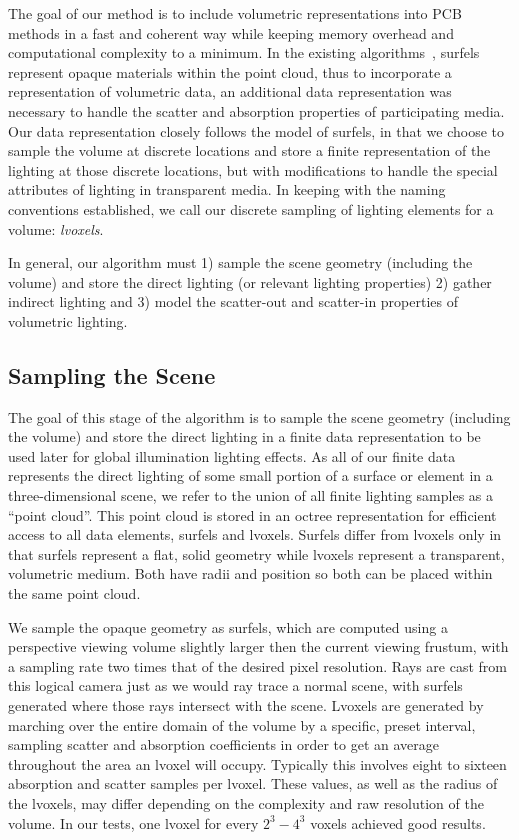 \documentclass[runningheads]{llncs}
\begin{document}
The goal of our method is to include volumetric representations into PCB methods in a fast and coherent way while keeping memory overhead and computational complexity to a minimum.  In the existing algorithms~\cite{christensen:2008}, surfels represent opaque materials within the point cloud, thus to incorporate a representation of volumetric data, an additional data representation was necessary to handle the scatter and absorption properties of participating media.  Our data representation closely follows the model of surfels, in that we choose to sample the volume at discrete locations and store a finite representation of the lighting at those discrete locations, but with modifications to handle the special attributes of lighting in transparent media.  In keeping with the naming conventions established, we call our discrete sampling of lighting elements for a volume: \emph{lvoxels}.  

In general, our algorithm must 1) sample the scene geometry (including the volume) and store the direct lighting (or relevant lighting properties) 2) gather indirect lighting and 3) model the scatter-out and scatter-in properties of volumetric lighting.

\subsection{Sampling the Scene}
The goal of this stage of the algorithm is to sample the scene geometry (including the volume) and store the direct lighting in a finite data representation to be used later for global illumination lighting effects.  As all of our finite data represents the direct lighting of some small portion of a surface or element in a three-dimensional scene, we refer to the union of all finite lighting samples as a ``point cloud''.  This point cloud is stored in an octree representation for efficient access to all data elements, surfels and lvoxels.  Surfels differ from lvoxels only in that surfels represent a flat, solid geometry while lvoxels represent a transparent, volumetric medium.  Both have radii and position so both can be placed within the same point cloud.  

We sample the opaque geometry as surfels, which are computed using a perspective viewing volume slightly larger then the current viewing frustum, with a sampling rate two times that of the desired pixel resolution.  Rays are cast from this logical camera just as we would ray trace a normal scene, with surfels generated where those rays intersect with the scene.  Lvoxels are generated by marching over the entire domain of the volume by a specific, preset interval, sampling scatter and absorption coefficients in order to get an average throughout the area an lvoxel will occupy.  Typically this involves eight to sixteen absorption and scatter samples per lvoxel.  These values, as well as the radius of the lvoxels, may differ depending on the complexity and raw resolution of the volume.  In our tests, one lvoxel for every $2^3 - 4^3$ voxels achieved good results.
\end{document}
